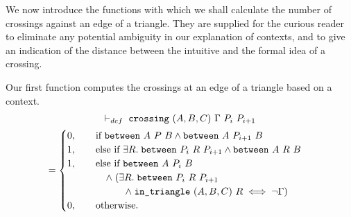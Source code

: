

We now introduce the functions with which we shall calculate the number of crossings against an edge of a triangle. They are supplied for the curious reader to eliminate any potential ambiguity in our explanation of contexts, and to give an indication of the distance between the intuitive and the formal idea of a crossing. 

Our first function computes the crossings at an edge of a triangle based on a context. 
\begin{multline}\label{eq:oneCrossingDef}
  \vdash_{def}\;\texttt{crossing}\ (A,B,C)\ \Gamma\ P_i\ P_{i+1}\\
  = 
  \begin{cases}
    0, \qquad\text{if }\texttt{between}\ A\ P\ B\wedge\texttt{between}\ A\ P_{i+1}\ B\\
    1, \qquad\text{else if }\exists R.\; \texttt{between}\ P_i\ R\ P_{i+1}\wedge\texttt{between}\ A\ R\ B\\
    1, \qquad\text{else if }\texttt{between}\ A\ P_i\ B\\
    \qquad\qquad\wedge\; (\exists R.\; \texttt{between}\ P_i\ R\ P_{i+1}\\
    \qquad\qquad\qquad\wedge\;\texttt{in\_triangle}\ (A,B,C)\ R \iff \neg\Gamma)\\
    0, \qquad\text{otherwise.}
  \end{cases}
\end{multline}

